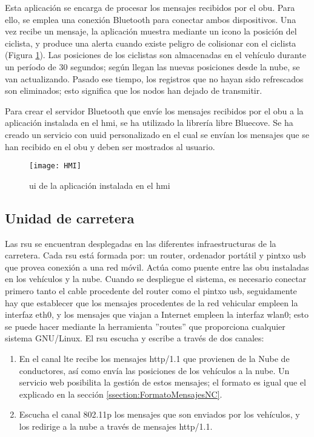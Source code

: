 Esta aplicación se encarga de procesar los mensajes recibidos por el \gls{obu}.
Para ello, se emplea una conexión Bluetooth para conectar ambos dispositivos.
Una vez recibe un mensaje, la aplicación muestra mediante un icono la posición
del ciclista, y produce una alerta cuando existe peligro de colisionar con el
ciclista (Figura \ref{figure:HMI}). Las posiciones de los ciclistas son
almacenadas en el vehículo durante un período de 30 segundos; según llegan las
nuevas posiciones desde la nube, se van actualizando. Pasado ese tiempo, los
registros que no hayan sido refrescados son eliminados; esto significa que los
nodos han dejado de transmitir.

Para crear el servidor Bluetooth que envíe los mensajes recibidos por el
\gls{obu} a la aplicación instalada en el \gls{hmi}, se ha utilizado la
librería libre Bluecove. Se ha creado un servicio con \gls{uuid} personalizado
en el cual se envían los mensajes que se han recibido en el \gls{obu} y deben
ser mostrados al usuario.

\begin{figure}[H]
	\begin{center}
		\texttt{[image: HMI]}
		\caption{\gls{ui} de la aplicación instalada en el \gls{hmi}}
		\label{figure:HMI}
	\end{center}
\end{figure}

\subsection{Unidad de carretera}
Las \gls{rsu} se encuentran desplegadas en las diferentes infraestructuras de
la carretera. Cada \gls{rsu} está formada por: un router, ordenador portátil
y pintxo \gls{usb} que provea conexión a una red móvil. Actúa como puente
entre las \gls{obu} instaladas en los vehículos y la nube. Cuando se despliegue
el sistema, es necesario conectar primero tanto el cable procedente del router
como el pintxo \gls{usb}, seguidamente hay que establecer que los mensajes
procedentes de la red vehicular empleen la interfaz eth0, y los mensajes que
viajan a Internet empleen la interfaz wlan0; esto se puede hacer mediante la
herramienta ''routes'' que proporciona cualquier sistema GNU/Linux. El
\gls{rsu} escucha y escribe a través de dos canales:
\begin{enumerate}
	\item En el canal \gls{lte} recibe los mensajes \Gls{http/1.1} que provienen
	de la Nube de conductores, así como envía las posiciones de los vehículos a
	la nube. Un 	servicio web posibilita la gestión de estos mensajes; el
	formato es igual que el	explicado en la sección \ref{ssection:FormatoMensajesNC}.

	\item Escucha el canal \Gls{802.11p} los mensajes que son enviados por
	los vehículos, y los redirige a la nube a través de mensajes \Gls{http/1.1}.
\end{enumerate}

